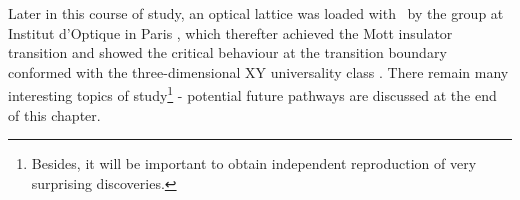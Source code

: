 	Later in this course of study, an optical lattice was loaded with \mhe~by the group at Institut d'Optique in Paris \cite{Cayla18}, which therefter achieved the Mott insulator transition \cite{Carcy19} and showed the critical behaviour at the transition boundary conformed with the three-dimensional XY universality class \cite{Herce21}.
	 There remain many interesting topics of study\footnote{Besides, it will be important to obtain independent reproduction of very surprising discoveries.} - potential future pathways are discussed at the end of this chapter.
	
	


	
	




